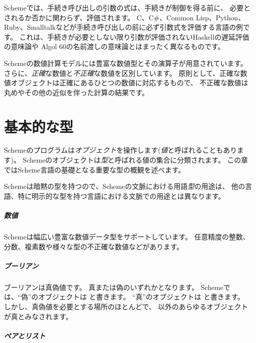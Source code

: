 Schemeでは、手続き呼び出しの引数の式は、手続きが制御を得る前に、
必要とされるか否かに関わらず、評価されます。
C、C\#、Common Lisp、Python、Ruby、Smalltalkなどが手続き呼び出しの前に必ず引数式を評価する言語の例です。
これは、手続きが必要としない限り引数が評価されないHaskellの遅延評価の意味論や
Algol 60の名前渡しの意味論とはまったく異なるものです。

Schemeの数値計算モデルには豊富な数値型とその演算子が用意されています。
さらに、\textit{正確}な数値と\textit{不正確}な数値を区別しています。
原則として、正確な数値オブジェクトは正確にあるひとつの数値に対応するもので、
不正確な数値は丸めやその他の近似を伴った計算の結果です。

\chapter{基本的な型}

Schemeのプログラムは\textit{オブジェクト}を操作します(\textit{値}と呼ばれることもあります)。
Schemeのオブジェクトは\textit{型}と呼ばれる値の集合に分類されます。
この章ではScheme言語の基礎となる重要な型の概観を述べます。

\begin{note}
  Schemeは暗黙の型を持つので、Schemeの文脈における用語\textit{型}の用途は、
  他の言語、特に明示的な型を持つ言語における文脈での用途とは異なります。
\end{note}

\paragraph{数値}

Schemeは幅広い豊富な数値データ型をサポートしています。
任意精度の整数、分数、複素数や様々な型の不正確な数値などがあります。

\paragraph{ブーリアン}

ブーリアンは真偽値です。
真または偽のいずれかとなります。
Schemeでは、``偽''のオブジェクトは \schfalse{} と書きます。
``真''のオブジェクトは \schtrue{} と書きます。
しかし、真偽値を必要とする場所のほとんどで、
\schfalse{} 以外のあらゆるオブジェクトが真とみなされます。

\paragraph{ペアとリスト}

